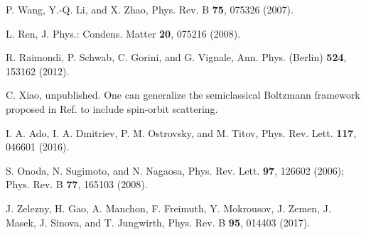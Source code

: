 \documentclass
[aps,pra,amsfonts,amssymb,twocolumn,amsmath,preprintnumbers,nofootinbib,floatfix,
showpacs,superscriptaddress]{revtex4-1}%
\begin{document}
\begin{thebibliography}{99}
P. Wang, Y.-Q. Li, and X. Zhao, Phys. Rev. B \textbf{75},
075326 (2007).

L. Ren, J. Phys.: Condens. Matter \textbf{20}, 075216 (2008).

R. Raimondi, P. Schwab, C. Gorini, and G. Vignale, Ann.
Phys. (Berlin) \textbf{524}, 153162 (2012).

C. Xiao, unpublished. One can generalize the
semiclassical Boltzmann framework proposed in Ref.  to
include spin-orbit scattering.

I. A. Ado, I. A. Dmitriev, P. M. Ostrovsky, and M. Titov, Phys.
Rev. Lett. \textbf{117}, 046601 (2016).

S. Onoda, N. Sugimoto, and N. Nagaosa, Phys. Rev. Lett.
\textbf{97}, 126602 (2006); Phys. Rev. B \textbf{77}, 165103 (2008).

J. Zelezny, H. Gao, A. Manchon, F. Freimuth, Y.
Mokrousov, J. Zemen, J. Masek, J. Sinova, and T. Jungwirth, Phys. Rev. B
\textbf{95}, 014403 (2017).
\end{thebibliography}
\end{document}
